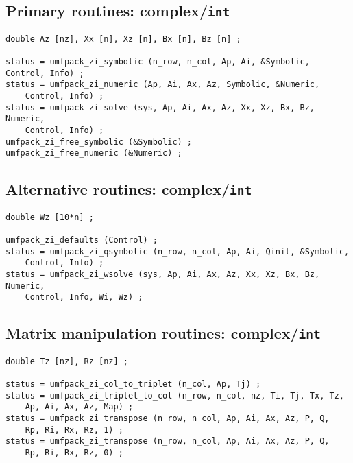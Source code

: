 \subsection{Primary routines: complex/{\tt int}}

{\footnotesize
\begin{verbatim}
double Az [nz], Xx [n], Xz [n], Bx [n], Bz [n] ;

status = umfpack_zi_symbolic (n_row, n_col, Ap, Ai, &Symbolic, Control, Info) ;
status = umfpack_zi_numeric (Ap, Ai, Ax, Az, Symbolic, &Numeric,
    Control, Info) ;
status = umfpack_zi_solve (sys, Ap, Ai, Ax, Az, Xx, Xz, Bx, Bz, Numeric,
    Control, Info) ;
umfpack_zi_free_symbolic (&Symbolic) ;
umfpack_zi_free_numeric (&Numeric) ;
\end{verbatim}
}

\subsection{Alternative routines: complex/{\tt int}}

{\footnotesize
\begin{verbatim}
double Wz [10*n] ;

umfpack_zi_defaults (Control) ;
status = umfpack_zi_qsymbolic (n_row, n_col, Ap, Ai, Qinit, &Symbolic,
    Control, Info) ;
status = umfpack_zi_wsolve (sys, Ap, Ai, Ax, Az, Xx, Xz, Bx, Bz, Numeric,
    Control, Info, Wi, Wz) ;
\end{verbatim}
}

\subsection{Matrix manipulation routines: complex/{\tt int}}

{\footnotesize
\begin{verbatim}
double Tz [nz], Rz [nz] ;

status = umfpack_zi_col_to_triplet (n_col, Ap, Tj) ;
status = umfpack_zi_triplet_to_col (n_row, n_col, nz, Ti, Tj, Tx, Tz,
    Ap, Ai, Ax, Az, Map) ;
status = umfpack_zi_transpose (n_row, n_col, Ap, Ai, Ax, Az, P, Q,
    Rp, Ri, Rx, Rz, 1) ;
status = umfpack_zi_transpose (n_row, n_col, Ap, Ai, Ax, Az, P, Q,
    Rp, Ri, Rx, Rz, 0) ;
\end{verbatim}
}

